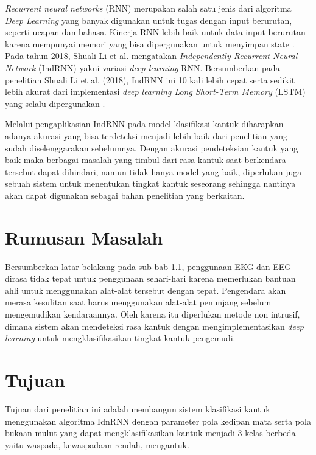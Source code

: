 \emph{Recurrent neural networks} (RNN) merupakan salah satu jenis
dari algoritma \emph{Deep Learning} yang banyak digunakan untuk tugas
dengan input berurutan, seperti ucapan dan bahasa. Kinerja RNN lebih baik
untuk data input berurutan karena mempunyai memori yang bisa
dipergunakan untuk menyimpan state \parencite{18}. Pada tahun 2018,
Shuali Li et al. mengatakan \emph{Independently Recurrent Neural Network}
(IndRNN) yakni variasi \emph{deep learning} RNN. Bersumberkan pada
penelitian Shuali Li et al. (2018), IndRNN ini 10 kali lebih cepat
serta sedikit lebih akurat dari implementasi \emph{deep learning Long Short-Term Memory}
(LSTM) yang selalu dipergunakan \parencite{8}.

Melalui pengaplikasian IndRNN pada model klasifikasi kantuk diharapkan
adanya akurasi yang bisa terdeteksi menjadi lebih baik dari penelitian
yang sudah diselenggarakan sebelumnya. Dengan akurasi pendeteksian
kantuk yang baik maka berbagai masalah yang timbul dari rasa kantuk
saat berkendara tersebut dapat dihindari, namun tidak hanya model
yang baik, diperlukan juga sebuah sistem untuk menentukan tingkat
kantuk seseorang sehingga nantinya akan dapat digunakan sebagai bahan
penelitian yang berkaitan.

\section{Rumusan Masalah}
\label{sec:permasalahan}

Bersumberkan latar belakang pada sub-bab 1.1, penggunaan EKG dan
EEG dirasa tidak tepat untuk penggunaan sehari-hari karena memerlukan
bantuan ahli untuk menggunakan alat-alat tersebut dengan tepat.
Pengendara akan merasa kesulitan saat harus menggunakan alat-alat
penunjang sebelum mengemudikan kendaraannya. Oleh karena itu
diperlukan metode non intrusif, dimana sistem akan mendeteksi
rasa kantuk dengan mengimplementasikan \emph{deep learning} untuk
mengklasifikasikan tingkat kantuk pengemudi.

\section{Tujuan}
\label{sec:Tujuan}

Tujuan dari penelitian ini adalah membangun sistem klasifikasi
kantuk menggunakan algoritma IdnRNN dengan parameter pola kedipan
mata serta pola bukaan mulut yang dapat mengklasifikasikan kantuk
menjadi 3 kelas berbeda yaitu waspada, kewaspadaan rendah, mengantuk.

